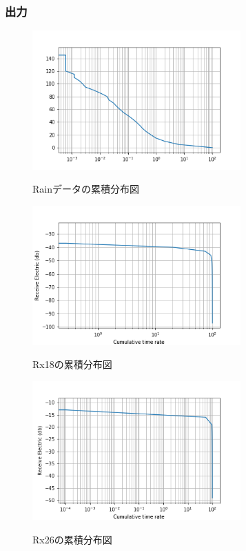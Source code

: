 \documentclass[a4paper,11pt,titlepage]{jarticle}
\begin{document}
\subsubsection{出力}
\begin{figure}[htbp]
  \centering
  \includegraphics[width=80mm]{Rain_cd.png}
  \label{Rainデータの累積分布図}\\
  \caption{Rainデータの累積分布図}
\end{figure}

\begin{figure}[htbp]
  \centering
  \includegraphics[width=80mm]{Rx18_cd.png}
  \label{Rx18の累積分布図}\\
  \caption{Rx18の累積分布図}
\end{figure}

\begin{figure}[htbp]
  \centering
  \includegraphics[width=80mm]{Rx26_cd.png}
  \label{Rx26の累積分布図}\\
  \caption{Rx26の累積分布図}
\end{figure}
\end{document}
